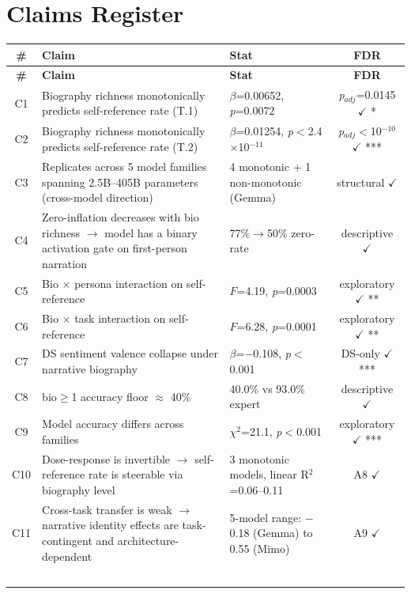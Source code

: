\documentclass[11pt,a4paper]{article}
\begin{document}
\section{Claims Register}
\label{sec:claims}

\begin{longtable}{c p{5.5cm} p{4.5cm} c}
\toprule
\textbf{\#} & \textbf{Claim} & \textbf{Stat} & \textbf{FDR} \\
\midrule
\endfirsthead
\toprule
\textbf{\#} & \textbf{Claim} & \textbf{Stat} & \textbf{FDR} \\
\midrule
\endhead
\bottomrule
\endfoot
C1 & Biography richness monotonically predicts self-reference rate (T.1) & $\beta$=0.00652, \textit{p}=0.0072 & \textit{p}$_{adj}$=0.0145 $\checkmark$ * \\
C2 & Biography richness monotonically predicts self-reference rate (T.2) & $\beta$=0.01254, \textit{p}$<$2.4$\times$10$^{-11}$ & \textit{p}$_{adj}$$<$10$^{-10}$ $\checkmark$ *** \\
C3 & Replicates across 5 model families spanning 2.5B--405B parameters (cross-model direction) & 4 monotonic + 1 non-monotonic (Gemma) & structural $\checkmark$ \\
C4 & Zero-inflation decreases with bio richness $\rightarrow$ model has a binary activation gate on first-person narration & 77\%$\rightarrow$50\% zero-rate & descriptive $\checkmark$ \\
C5 & Bio $\times$ persona interaction on self-reference & $F$=4.19, \textit{p}=0.0003 & exploratory $\checkmark$ ** \\
C6 & Bio $\times$ task interaction on self-reference & $F$=6.28, \textit{p}=0.0001 & exploratory $\checkmark$ ** \\
C7 & DS sentiment valence collapse under narrative biography & $\beta$=$-$0.108, \textit{p}$<$0.001 & DS-only $\checkmark$ *** \\
C8 & bio$\geq$1 accuracy floor $\approx$ 40\% & 40.0\% vs 93.0\% expert & descriptive $\checkmark$ \\
C9 & Model accuracy differs across families & $\chi^2$=21.1, \textit{p}$<$0.001 & exploratory $\checkmark$ *** \\
C10 & Dose-response is invertible $\rightarrow$ self-reference rate is steerable via biography level & 3 monotonic models, linear R$^2$=0.06--0.11 & A8 $\checkmark$ \\
C11 & Cross-task transfer is weak $\rightarrow$ narrative identity effects are task-contingent and architecture-dependent & 5-model range: $-$0.18 (Gemma) to 0.55 (Mimo) & A9 $\checkmark$ \\
$$
\end{longtable}
\end{document}
